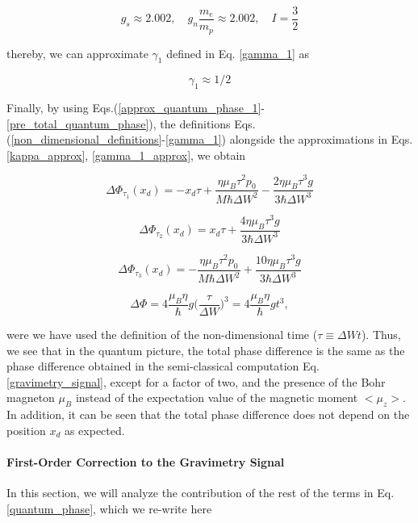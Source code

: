 \documentclass{article}
\begin{document}
\begin{equation}
g_{s} \approx 2.002 \mathrm{,}\quad g_{n} \frac{m_{e}}{m_{p}} \approx 2.002 \mathrm{,}\quad I = \frac{3}{2}
\end{equation}

thereby, we can approximate $\gamma_{1}$ defined in Eq. \ref{gamma_1} as

\begin{equation}\label{gamma_1_approx}
\gamma_{1} \approx 1/2
\end{equation}

Finally, by using Eqs.(\ref{approx_quantum_phase_1}-\ref{pre_total_quantum_phase}), the definitions Eqs.(\ref{non_dimensional_definitions}-\ref{gamma_1}) alongside the approximations in Eqs. \ref{kappa_approx}, \ref{gamma_1_approx}, we obtain

\begin{equation}
\Delta \Phi_{\tau_{1}}(x_{d}) = -x_{d}\tau + \frac{\eta \mu_{B} \tau^{2} p_{0}}{M \hbar \Delta W^{2}} - \frac{2 \eta \mu_{B} \tau^{3} g}{3 \hbar \Delta W^{3}}
\end{equation}

\begin{equation}
\Delta \Phi_{\tau_{2}}(x_{d}) = x_{d}\tau + \frac{4 \eta \mu_{B} \tau^{3} g}{3 \hbar \Delta W^{3}}
\end{equation}

\begin{equation}
\Delta \Phi_{\tau_{3}}(x_{d}) = -\frac{\eta \mu_{B} \tau^{2} p_{0}}{M \hbar \Delta W^{2}} + \frac{10 \eta \mu_{B} \tau^{3} g}{3 \hbar \Delta W^{3}}
\end{equation}

\begin{equation}\label{quantum_gravimetry_signal}
\Delta \Phi = 4 \frac{\mu_{B} \eta }{\hbar} g \bigg(\frac{\tau}{\Delta W}\bigg)^{3} = 4 \frac{\mu_{B} \eta }{\hbar} g t^{3},
\end{equation}

were we have used the definition of the non-dimensional time ($\tau\equiv \Delta W t$). Thus, we see that in the quantum picture, the total phase difference is the same as the phase difference obtained in the semi-classical computation Eq. \ref{gravimetry_signal}, except for a factor of two, and the presence of the Bohr magneton $\mu_{B}$ instead of the expectation value of the magnetic moment $<\mu_{z}>$. In addition, it can be seen that the total phase difference does not depend on the position $x_{d}$ as expected.

\paragraph{First-Order Correction to the Gravimetry Signal}
In this section, we will analyze the contribution of the rest of the terms in Eq. \ref{quantum_phase}, which we re-write here
\end{document}
